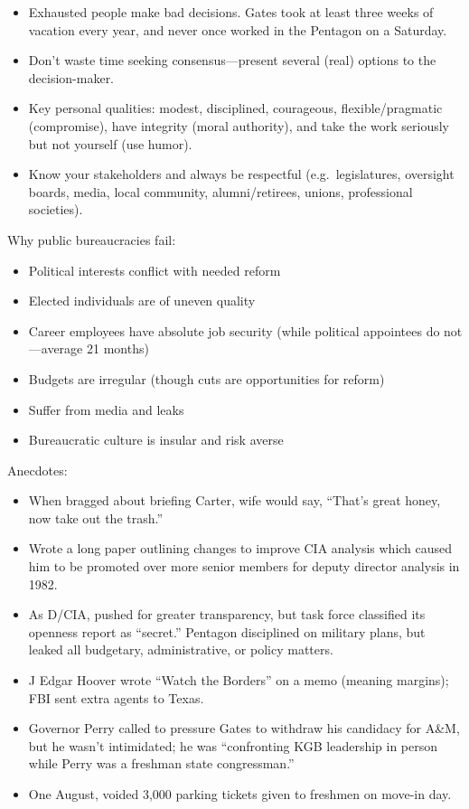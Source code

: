\documentclass[
]{article}
\begin{document}
\begin{itemize}
\item
  Exhausted people make bad decisions. Gates took at least three weeks
  of vacation every year, and never once worked in the Pentagon on a
  Saturday.
\item
  Don't waste time seeking consensus---present several (real) options to
  the decision-maker.
\item
  Key personal qualities: modest, disciplined, courageous,
  flexible/pragmatic (compromise), have integrity (moral authority), and
  take the work seriously but not yourself (use humor).
\item
  Know your stakeholders and always be respectful (e.g.~legislatures,
  oversight boards, media, local community, alumni/retirees, unions,
  professional societies).
\end{itemize}

Why public bureaucracies fail:

\begin{itemize}
\item
  Political interests conflict with needed reform
\item
  Elected individuals are of uneven quality
\item
  Career employees have absolute job security (while political
  appointees do not---average 21 months)
\item
  Budgets are irregular (though cuts are opportunities for reform)
\item
  Suffer from media and leaks
\item
  Bureaucratic culture is insular and risk averse
\end{itemize}

Anecdotes:

\begin{itemize}
\item
  When bragged about briefing Carter, wife would say, ``That's great
  honey, now take out the trash.''
\item
  Wrote a long paper outlining changes to improve CIA analysis which
  caused him to be promoted over more senior members for deputy director
  analysis in 1982.
\item
  As D/CIA, pushed for greater transparency, but task force classified
  its openness report as ``secret.'' Pentagon disciplined on military
  plans, but leaked all budgetary, administrative, or policy matters.
\item
  J Edgar Hoover wrote ``Watch the Borders'' on a memo (meaning
  margins); FBI sent extra agents to Texas.
\item
  Governor Perry called to pressure Gates to withdraw his candidacy for
  A\&M, but he wasn't intimidated; he was ``confronting KGB leadership
  in person while Perry was a freshman state congressman.''
\item
  One August, voided 3,000 parking tickets given to freshmen on move-in
  day.
\end{itemize}
\end{document}

